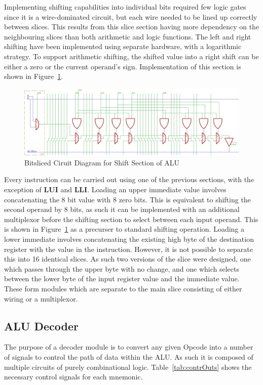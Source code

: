 Implementing shifting capabilities into individual bits required few logic gates since it is a wire-dominated circuit, but each wire needed to be lined up correctly between slices. 
This results from this slice section having more dependency on the neighbouring slices than both arithmetic and logic functions. 
The left and right shifting have been implemented using separate hardware, with a logarithmic strategy. 
To support arithmetic shifting, the shifted value into a right shift can be either a zero or the current operand's sign.
Implementation of this section is shown in Figure~\ref{fig:ShiftSlice}. 


\begin{figure}[h]
	\centering
	\includegraphics[scale=0.75]{Figures/ShiftSlice.png}
	\caption{Bitsliced Ciruit Diagram for Shift Section of ALU}
	\label{fig:ShiftSlice}
\end{figure}

Every instruction can be carried out using one of the previous sections, with the exception of \textbf{LUI} and \textbf{LLI}. 
Loading an upper immediate value involves concatenating the 8 bit value with 8 zero bits. 
This is equivalent to shifting the second operand by 8 bits, as such it can be implemented with an additional multiplexor before the shifting section to select between each input operand. 
This is shown in Figure~\ref{fig:ShiftSlice} as a precurser to standard shifting operation. 
Loading a lower immediate involves concatenating the existing high byte of the destination register with the value in the instruction. 
However, it is not possible to separate this into 16 identical slices. 
As such two versions of the slice were designed, one which passes through the upper byte with no change, and one which selects between the lower byte of the input register value and the immediate value. 
These form modules which are separate to the main slice consisting of either wiring or a multiplexor.

\subsection{ALU Decoder}
The purpose of a decoder module is to convert any given Opcode into a number of signals to control the path of data within the ALU. 
As such it is composed of multiple circuits of purely combinational logic. 
Table~\ref{tab:contrOuts} shows the necessary control signals for each mnemonic.

